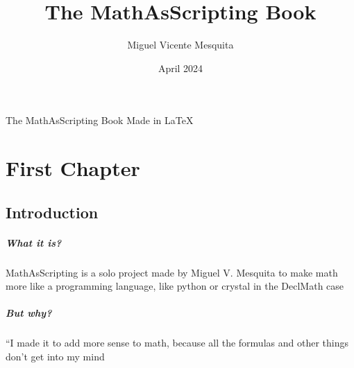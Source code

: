 \documentclass{book}
\title{The MathAsScripting Book}
\author{Miguel Vicente Mesquita}
\date{April 2024}
\begin{document}
\maketitle
The MathAsScripting Book
Made in \LaTeX{}

\newpage

\chapter{First Chapter}

\section{Introduction}

\paragraph{What it is?}
MathAsScripting is a solo project made by Miguel V. Mesquita to make math more
like a programming language, like python or crystal in the DeclMath case

\paragraph{But why?}
``I made it to add more sense to math, because all the formulas and other things don't get into my mind
\end{document}
